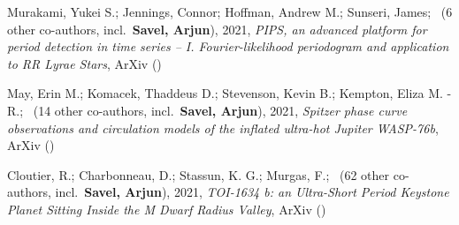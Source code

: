 \item[{\color{numcolor}\scriptsize3}] Murakami, Yukei S.; Jennings, Connor; Hoffman, Andrew M.; Sunseri, James; \etal\ ({6} other co-authors, incl.\ \textbf{Savel, Arjun}), 2021, \emph{PIPS, an advanced platform for period detection in time series -- I. Fourier-likelihood periodogram and application to RR Lyrae Stars}, ArXiv ()

\item[{\color{numcolor}\scriptsize2}] May, Erin M.; Komacek, Thaddeus D.; Stevenson, Kevin B.; Kempton, Eliza M. -R.; \etal\ ({14} other co-authors, incl.\ \textbf{Savel, Arjun}), 2021, \emph{Spitzer phase curve observations and circulation models of the inflated ultra-hot Jupiter WASP-76b}, ArXiv ()

\item[{\color{numcolor}\scriptsize1}] Cloutier, R.; Charbonneau, D.; Stassun, K. G.; Murgas, F.; \etal\ ({62} other co-authors, incl.\ \textbf{Savel, Arjun}), 2021, \emph{TOI-1634 b: an Ultra-Short Period Keystone Planet Sitting Inside the M Dwarf Radius Valley}, ArXiv ()